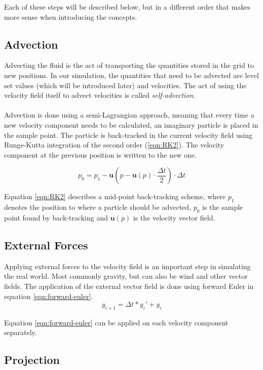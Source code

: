 \documentclass[twocolumn]{article}
\begin{document}
Each of these steps will be described below, but in a different order that makes more sense when introducing the concepts.

\subsection{Advection}
Advecting the fluid is the act of transporting the quantities stored in the grid to new positions. In our simulation, the quantities that need to be advected are level set values (which will be introduced later) and velocities. The act of using the velocity field itself to advect velocities is called \emph{self-advection}.
\\\\
Advection is done using a semi-Lagrangian approach, meaning that every time a new velocity component needs to be calculated, an imaginary particle is placed in the sample point. The particle is back-tracked in the current velocity field using Runge-Kutta integration of the second order (\ref{eqn:RK2}). The velocity component at the previous position is written to the new one.

\begin{equation}
p_0=p_1-\mathbf{u}(p- \mathbf{u}(p)\cdot \frac{\Delta t}{2})\cdot \Delta t
\label{eqn:RK2}
\end{equation}

Equation \ref{eqn:RK2} describes a mid-point back-tracking scheme, where $p_1$ denotes the position to where a particle should be advected, $p_0$ is the sample point found by back-tracking and $\mathbf{u}(p)$ is the velocity vector field.

\subsection{External Forces}
Applying external forces to the velocity field is an important step in simulating the real world. Most commonly gravity, but can also be wind and other vector fields. The application of the external vector field is done using forward Euler in equation \ref{eqn:forward-euler}.
\begin{equation}
  y_{i+1} = \Delta t * y_i' + y_i 
    \label{eqn:forward-euler}
\end{equation}

Equation \ref{eqn:forward-euler} can be applied on each velocity component separately.

\subsection{Projection}
\end{document}
